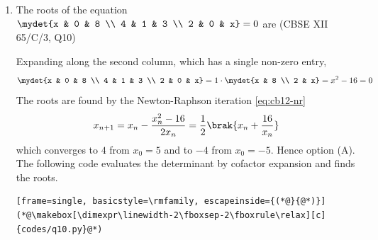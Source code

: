 \begin{enumerate}[label=\thesubsection.\arabic*, ref=\thesubsection.\theenumi,itemsep=0pt]
\solution Put $x = \sin\theta$, $dx = \cos\theta\,d\theta$, $\theta \in \sbrak{0, \frac{\pi}{2}}$. Then $\tan\theta\cos\theta = \sin\theta$ and
\begin{align}
\int_0^1 \tan\brak{\sin^{-1}x}\,dx = \int_0^{\pi/2}\sin\theta\,d\theta
\end{align}
The trapezoidal rule \eqref{eq:cb12-trap} gives $0.99794$ for $N = 10$, $0.99998$ for $N = 100$ and $1.00000$ for $N = 10^4$, so the value is $1$ (exactly $\sbrak{-\cos\theta}_0^{\pi/2} = 1$). Hence option (D). The following code verifies this.
\begin{lstlisting}[frame=single, basicstyle=\rmfamily, escapeinside={(*@}{@*)}]
(*@\makebox[\dimexpr\linewidth-2\fboxsep-2\fboxrule\relax][c]{codes/q9.py}@*)
\end{lstlisting}

\item The roots of the equation $\mydet{x & 0 & 8 \\ 4 & 1 & 3 \\ 2 & 0 & x} = 0$ are
\hfill (CBSE XII 65/C/3, Q10)
\begin{enumerate}[itemsep=0pt]
\end{enumerate}

\solution Expanding along the second column, which has a single non-zero entry,
\begin{align}
\mydet{x & 0 & 8 \\ 4 & 1 & 3 \\ 2 & 0 & x} = 1\cdot\mydet{x & 8 \\ 2 & x} = x^2 - 16 = 0
\end{align}
The roots are found by the Newton-Raphson iteration \eqref{eq:cb12-nr}
\begin{align}
x_{n+1} = x_n - \frac{x_n^2 - 16}{2x_n} = \frac{1}{2}\brak{x_n + \frac{16}{x_n}}
\end{align}
which converges to $4$ from $x_0 = 5$ and to $-4$ from $x_0 = -5$. Hence option (A). The following code evaluates the determinant by cofactor expansion and finds the roots.
\begin{lstlisting}[frame=single, basicstyle=\rmfamily, escapeinside={(*@}{@*)}]
(*@\makebox[\dimexpr\linewidth-2\fboxsep-2\fboxrule\relax][c]{codes/q10.py}@*)
\end{lstlisting}


\end{enumerate}
